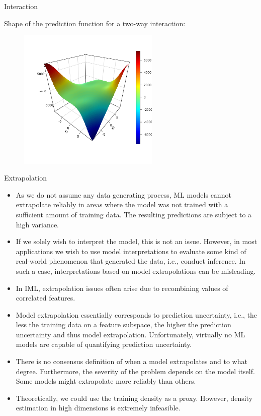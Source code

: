 \documentclass[11pt,compress,t,notes=noshow, xcolor=table]{beamer}
\begin{document}
\begin{vbframe}{Interaction}

Shape of the prediction function for a two-way interaction:

\begin{figure}
\includegraphics[width = 0.6\textwidth]{figure/interaction}
\end{figure}
\end{vbframe}


\begin{vbframe}{Extrapolation}
\begin{itemize}
\itemsep2em
\item As we do not assume any data generating process, ML models cannot extrapolate reliably in areas where the model was not trained with a sufficient amount of training data. The resulting predictions are subject to a high variance.
\item If we solely wish to interpret the model, this is not an issue. However, in most applications we wish to use model interpretations to evaluate some kind of real-world phenomenon that generated the data, i.e., conduct inference. In such a case, interpretations based on model extrapolations can be misleading.
\item In IML, extrapolation issues often arise due to recombining values of correlated features.
\item Model extrapolation essentially corresponds to prediction uncertainty, i.e., the less the training data on a feature subspace, the higher the prediction uncertainty and thus model extrapolation. Unfortunately, virtually no ML models are capable of quantifying prediction uncertainty.
\item There is no consensus definition of when a model extrapolates and to what degree. Furthermore, the severity of the problem depends on the model itself. Some models might extrapolate more reliably than others.
\item Theoretically, we could use the training density as a proxy. However, density estimation in high dimensions is extremely infeasible.
\end{itemize}

\end{vbframe}
\end{document}
